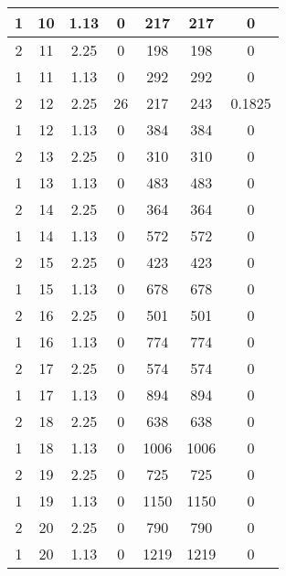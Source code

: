 \documentclass[letterpaper, 12pt]{article}
\begin{document}
\begin{longtable}{|c|c|c|c|c|c|c|}
\hline
1 & 10 & 1.13 & 0 & 217 & 217 & 0 \\
\hline
2 & 11 & 2.25 & 0 & 198 & 198 & 0 \\
\hline
1 & 11 & 1.13 & 0 & 292 & 292 & 0 \\
\hline
2 & 12 & 2.25 & 26 & 217 & 243 & 0.1825 \\
\hline
1 & 12 & 1.13 & 0 & 384 & 384 & 0 \\
\hline
2 & 13 & 2.25 & 0 & 310 & 310 & 0 \\
\hline
1 & 13 & 1.13 & 0 & 483 & 483 & 0 \\
\hline
2 & 14 & 2.25 & 0 & 364 & 364 & 0 \\
\hline
1 & 14 & 1.13 & 0 & 572 & 572 & 0 \\
\hline
2 & 15 & 2.25 & 0 & 423 & 423 & 0 \\
\hline
1 & 15 & 1.13 & 0 & 678 & 678 & 0 \\
\hline
2 & 16 & 2.25 & 0 & 501 & 501 & 0 \\
\hline
1 & 16 & 1.13 & 0 & 774 & 774 & 0 \\
\hline
2 & 17 & 2.25 & 0 & 574 & 574 & 0 \\
\hline
1 & 17 & 1.13 & 0 & 894 & 894 & 0 \\
\hline
2 & 18 & 2.25 & 0 & 638 & 638 & 0 \\
\hline
1 & 18 & 1.13 & 0 & 1006 & 1006 & 0 \\
\hline
2 & 19 & 2.25 & 0 & 725 & 725 & 0 \\
\hline
1 & 19 & 1.13 & 0 & 1150 & 1150 & 0 \\
\hline
2 & 20 & 2.25 & 0 & 790 & 790 & 0 \\
\hline
1 & 20 & 1.13 & 0 & 1219 & 1219 & 0 \\
\hline
\end{longtable}
\end{document}
